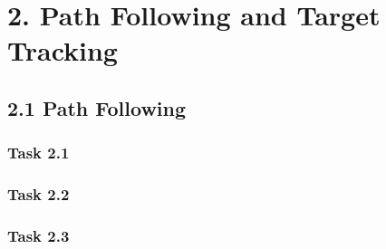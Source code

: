 \newpage
\section*{2. Path Following and Target Tracking}
\subsection*{2.1 Path Following}

\subsubsection*{Task 2.1}
\subsubsection*{Task 2.2}
\subsubsection*{Task 2.3}

